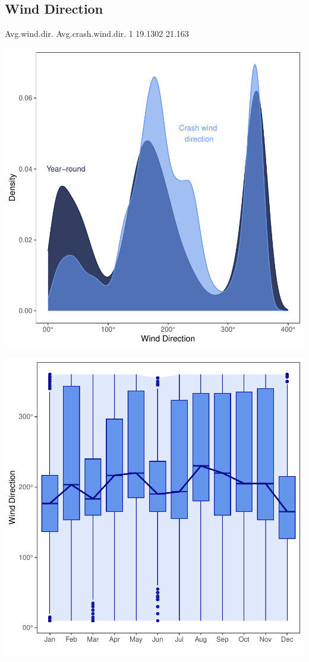 \documentclass[11pt, a4paper]{article}
\begin{document}
\pagebreak
\subsection{Wind Direction}

\begin{Schunk}
\begin{Soutput}
  Avg.wind.dir. Avg.crash.wind.dir.
1       19.1302              21.163
\end{Soutput}
\end{Schunk}
\includegraphics{variableinvestigation-015}

\includegraphics{variableinvestigation-016}
\end{document}

